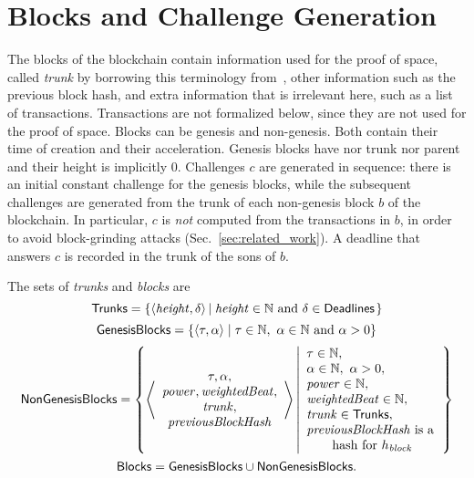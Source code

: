 \section{Blocks and Challenge Generation}\label{sec:challenge_generation}
%
The blocks of the blockchain contain information used for the proof
of space, called \emph{trunk} by borrowing this terminology from~\cite{CohenP19},
other information such as the previous block hash,
and extra information that is irrelevant here, such as a list of transactions.
Transactions are not formalized below, since they are not used for the proof of space.
Blocks can be genesis and non-genesis. Both contain their time of creation and their acceleration.
Genesis blocks have nor trunk nor parent and their height is implicitly $0$.
Challenges $c$ are generated in sequence: there is an initial constant challenge for the genesis
blocks, while the subsequent challenges are generated from the trunk of
each non-genesis block $b$ of the blockchain.
In particular, $c$ is \emph{not} computed from the transactions in $b$,
in order to avoid block-grinding attacks (Sec.~\ref{sec:related_work}).
A deadline that answers $c$ is recorded in the trunk of the sons of $b$.
%
\begin{definition}\label{def:trunk}
  The sets of \emph{trunks} and \emph{blocks} are
  \[
  {\mathsf{Trunks}}=\left\{\langle{\mathit{height}},\delta\rangle\left|\;{\mathit{height}}\in\mathbb{N}\text{ and }\delta\in{\mathsf{Deadlines}}\right.\right\}
  \]
  \[
  \GenesisBlocks=\left\{\langle\tau,\alpha\rangle\mid\tau\in\mathbb{N},\ \alpha\in\mathbb{N}\text{ and }\alpha>0\right\}
  \]
  \[
  {\mathsf{NonGenesisBlocks}}=\left\{\left\langle\begin{array}{c}
  \tau,\alpha,\\
  {\mathit{power}},\mathit{weightedBeat},\\
  {\mathit{trunk}},\\
  {\mathit{previousBlockHash}}
  \end{array}\right\rangle\left|\begin{array}{l}
  \tau\in\mathbb{N},\\
  \alpha\in\mathbb{N},\ \alpha>0,\\
  {\mathit{power}}\in\mathbb{N},\\
  \mathit{weightedBeat}\in\mathbb{N},\\
  {\mathit{trunk}}\in{\mathsf{Trunks}},\\
  {\mathit{previousBlockHash}}\text{ is a}\\
  \qquad\text{hash for $h_{\mathit{block}}$}
  \end{array}\right.\right\}
  \]
  \[
  {\mathsf{Blocks}}={\mathsf{GenesisBlocks}}\cup{\mathsf{NonGenesisBlocks}}.
  \]
\end{definition}
